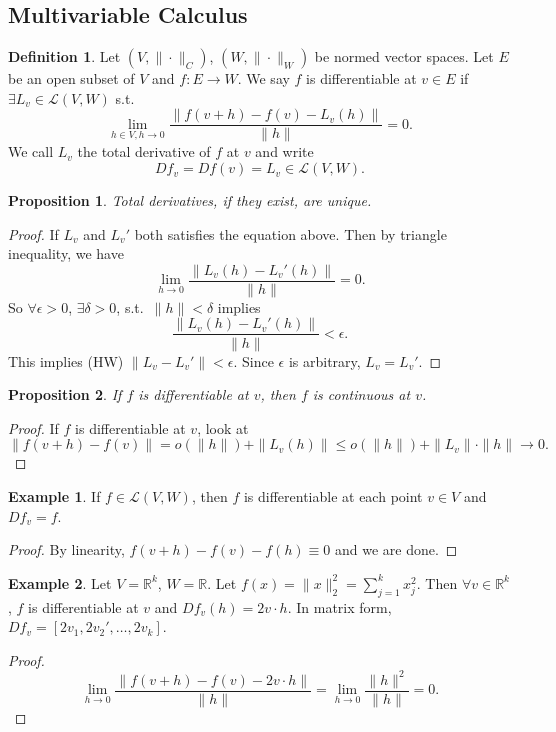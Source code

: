 \documentclass[12pt]{article}
\theoremstyle{plain}
\newtheorem*{prop}{Proposition}
\theoremstyle{definition}
\newtheorem*{defn}{Definition}
\newtheorem*{eg}{Example}
\begin{document}
\subsection*{Multivariable Calculus}
\begin{defn}
    Let $(V, \|\cdot\|_C)$, $(W, \|\cdot\|_W)$ be normed vector spaces.
    Let $E$ be an open subset of $V$ and $f:E\rightarrow W$.
    We say $f$ is differentiable at $v\in E$ if $\exists L_v\in \mathcal{L}(V,W)$ s.t.
    \[
        \lim_{h\in V, h\rightarrow 0} \frac{\|f(v+h)-f(v)-L_v(h)\|}{\|h\|} = 0.
    \]
    We call $L_v$ the total derivative of $f$ at $v$ and write
    \[
        Df_v = Df(v) = L_v \in \mathcal{L}(V,W).
    \]
\end{defn}

\begin{prop}
    Total derivatives, if they exist, are unique.
\end{prop}
\begin{proof}
    If $L_v$ and $L_v'$ both satisfies the equation above.
    Then by triangle inequality, we have
    \[
        \lim_{h\rightarrow 0}\frac{\|L_v(h)-L_v'(h)\|}{\|h\|} = 0.
    \]
    So $\forall \epsilon>0$, $\exists \delta>0$, s.t.\ $\|h\|<\delta$ implies
    \[
        \frac{\|L_v(h)-L_v'(h)\|}{\|h\|}<\epsilon.
    \]
    This implies (HW) $\|L_v-L_v'\|<\epsilon$.
    Since $\epsilon$ is arbitrary, $L_v=L_v'$.
\end{proof}

\begin{prop}
    If $f$ is differentiable at $v$, then $f$ is continuous at $v$.
\end{prop}
\begin{proof}
    If $f$ is differentiable at $v$, look at
    \[
        \|f(v+h)-f(v)\|
        =o(\|h\|)+\|L_v(h)\|
        \leq o(\|h\|)+\|L_v\|\cdot\|h\|
        \rightarrow 0.
    \]
\end{proof}

\begin{eg}
    If $f\in \mathcal{L}(V,W)$, then $f$ is differentiable at each point $v\in V$ and $Df_v=f$.
\end{eg}
\begin{proof}
    By linearity, $f(v+h) - f(v) - f(h) \equiv 0$ and we are done.
\end{proof}

\begin{eg}
    Let $V = \mathbb{R}^k$, $W=\mathbb{R}$.
    Let $f(x) = \|x\|_2^2 = \sum_{j=1}^k x_j^2$.
    Then $\forall v\in\mathbb{R}^k$, $f$ is differentiable at $v$ and $Df_v(h) = 2v\cdot h$.
    In matrix form, 
    $Df_v=[2v_1, 2v_2', \ldots, 2v_k]$.
\end{eg}
\begin{proof}
    \[
        \lim_{h\rightarrow 0}\frac{\|f(v+h)-f(v)-2v\cdot h\|}{\|h\|} = \lim_{h\rightarrow 0}\frac{\|h\|^2}{\|h\|} = 0.
    \]
\end{proof}
\end{document}
